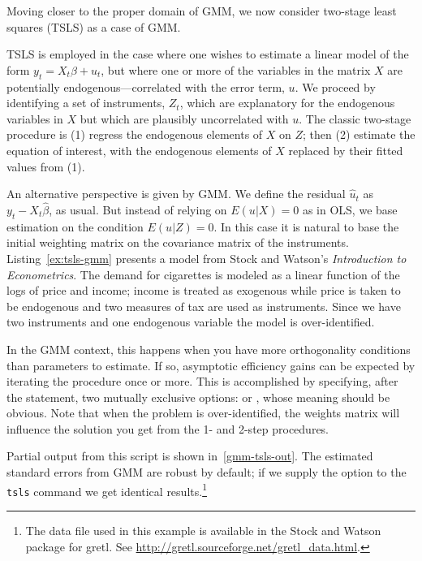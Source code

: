 Moving closer to the proper domain of GMM, we now consider two-stage
least squares (TSLS) as a case of GMM.  

TSLS is employed in the case where one wishes to estimate a linear
model of the form $y_t = X_t \beta + u_t$, but where one or more of
the variables in the matrix $X$ are potentially
endogenous---correlated with the error term, $u$.  We proceed by
identifying a set of instruments, $Z_t$, which are explanatory for the
endogenous variables in $X$ but which are plausibly uncorrelated with
$u$.  The classic two-stage procedure is (1) regress the endogenous
elements of $X$ on $Z$; then (2) estimate the equation of interest,
with the endogenous elements of $X$ replaced by their fitted values
from (1).

An alternative perspective is given by GMM.  We define the residual
$\hat{u}_t$ as $y_t - X_t \hat{\beta}$, as usual.  But instead of
relying on $E(u|X) = 0$ as in OLS, we base estimation on the condition
$E(u|Z) = 0$.  In this case it is natural to base the initial
weighting matrix on the covariance matrix of the instruments.
Listing~\ref{ex:tsls-gmm} presents a model from Stock and Watson's
\textit{Introduction to Econometrics}.  The demand for cigarettes is
modeled as a linear function of the logs of price and income; income
is treated as exogenous while price is taken to be endogenous and two
measures of tax are used as instruments.  Since we have two
instruments and one endogenous variable the model is over-identified.

In the GMM context, this happens when you have more orthogonality
conditions than parameters to estimate. If so, asymptotic efficiency
gains can be expected by iterating the procedure once or more. This is
accomplished by specifying, after the  statement, two
mutually exclusive options:  or ,
whose meaning should be obvious.  Note that when the problem is
over-identified, the weights matrix will influence the solution you
get from the 1- and 2-step procedures.



Partial output from this script is shown in~\ref{gmm-tsls-out}.  The
estimated standard errors from GMM are robust by default; if we supply
the  option to the \texttt{tsls} command we get
identical results.\footnote{The data file used in this example is
  available in the Stock and Watson package for gretl.  See
  \url{http://gretl.sourceforge.net/gretl_data.html}.}

